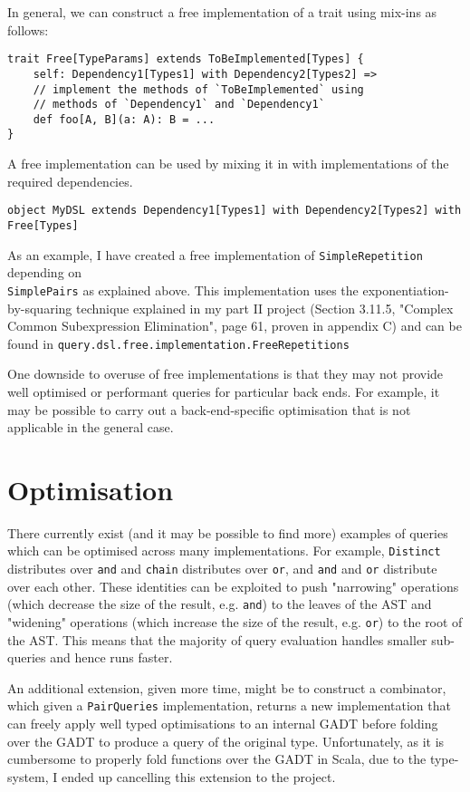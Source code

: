 \documentclass{report}
\newcommand \2[0]{\textbf{2}}
\newcommand \3[0]{\textbf{3}}
\begin{document}
In general, we can construct a free implementation of a trait using mix-ins as follows:

\begin{verbatim}
trait Free[TypeParams] extends ToBeImplemented[Types] {
    self: Dependency1[Types1] with Dependency2[Types2] =>
    // implement the methods of `ToBeImplemented` using 
    // methods of `Dependency1` and `Dependency1`
    def foo[A, B](a: A): B = ...
}
\end{verbatim}

A free implementation can be used by mixing it in with implementations of the required dependencies.

\begin{verbatim}
object MyDSL extends Dependency1[Types1] with Dependency2[Types2] with Free[Types]
\end{verbatim}

As an example, I have created a free implementation of \texttt{SimpleRepetition} depending on \\\texttt{SimplePairs} as explained above. This  implementation uses the exponentiation-by-squaring technique explained in my part II project (Section 3.11.5, "Complex Common Subexpression Elimination", page 61, proven in appendix C) and can be found in \texttt{query.dsl.free.implementation.FreeRepetitions}

One downside to overuse of free implementations is that they may not provide well optimised or performant queries for particular back ends. For example, it may be possible to carry out a back-end-specific optimisation that is not applicable in the general case.

\section{Optimisation}
There currently exist (and it may be possible to find more) examples of queries which can be optimised across many implementations. For example, \texttt{Distinct} distributes over \texttt{and} and \texttt{chain} distributes over \texttt{or}, and \texttt{and} and \texttt{or} distribute over each other. These identities can be exploited to push "narrowing" operations (which decrease the size of the result, e.g. \texttt{and}) to the leaves of the AST and "widening" operations (which increase the size of the result, e.g. \texttt{or}) to the root of the AST. This means that the majority of query evaluation handles smaller sub-queries and hence runs faster.

An additional extension, given more time, might be to construct a combinator, which given a \texttt{PairQueries} implementation, returns a new implementation that can freely apply well typed optimisations to an internal GADT before folding over the GADT to produce a query of the original type. Unfortunately, as it is cumbersome to properly fold functions over the GADT in Scala, due to the type-system, I ended up cancelling this extension to the project.
\end{document}
